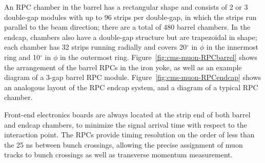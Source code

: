 An RPC chamber in the barrel has a rectangular shape and consists of 2 or 3 double-gap modules with up to 96 strips per double-gap, in which the strips run parallel to the beam direction; there are a total of 480 barrel chambers. In the endcap, chambers also have a double-gap structure but are trapezoidal in shape; each chamber has 32 strips running radially and covers 20$^{\circ}$ in $\phi$ in the innermost ring and 10$^{\circ}$ in $\phi$ in the outermost ring. Figure~\ref{fig:cms-muon-RPCbarrel} shows the arrangement of the barrel RPCs in the iron yoke, as well as an example diagram of a 3-gap barrel RPC module. Figure~\ref{fig:cms-muon-RPCendcap} shows an analogous layout of the RPC endcap system, and a diagram of a typical RPC chamber.

Front-end electronics boards are always located at the strip end of both barrel and endcap chambers, to minimize the signal arrival time with respect to the interaction point. The RPCs provide timing resolution on the order of less than the 25 ns between bunch crossings, allowing the precise assignment of muon tracks to bunch crossings as well as transverse momentum measurement.


